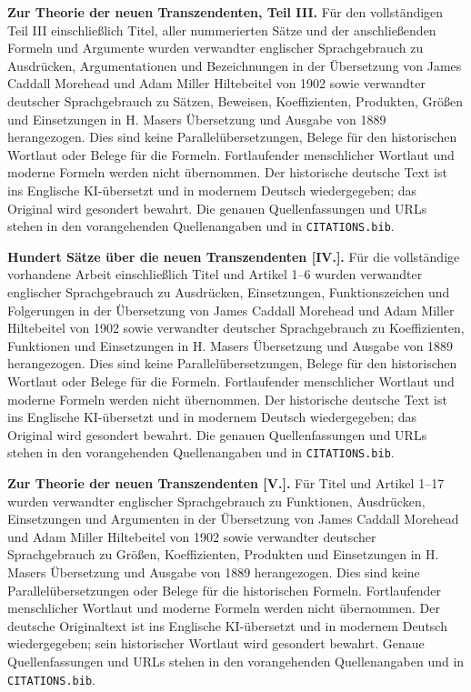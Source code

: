 \clearpage\thispagestyle{empty}\begingroup\fontsize{9}{9.5}\selectfont\raggedright
{}\medskip
\par\medskip\textbf{Zur Theorie der neuen Transzendenten, Teil III.} Für den vollständigen Teil III einschließlich Titel, aller nummerierten Sätze und der anschließenden Formeln und Argumente wurden verwandter englischer Sprachgebrauch zu Ausdrücken, Argumentationen und Bezeichnungen in der Übersetzung von James Caddall Morehead und Adam Miller Hiltebeitel von 1902 sowie verwandter deutscher Sprachgebrauch zu Sätzen, Beweisen, Koeffizienten, Produkten, Größen und Einsetzungen in H. Masers Übersetzung und Ausgabe von 1889 herangezogen. Dies sind keine Parallelübersetzungen, Belege für den historischen Wortlaut oder Belege für die Formeln. Fortlaufender menschlicher Wortlaut und moderne Formeln werden nicht übernommen. Der historische deutsche Text ist ins Englische KI-übersetzt und in modernem Deutsch wiedergegeben; das Original wird gesondert bewahrt. Die genauen Quellenfassungen und URLs stehen in den vorangehenden Quellenangaben und in \texttt{CITATIONS.bib}.
\par\medskip\textbf{Hundert Sätze über die neuen Transzendenten [IV.].} Für die vollständige vorhandene Arbeit einschließlich Titel und Artikel 1--6 wurden verwandter englischer Sprachgebrauch zu Ausdrücken, Einsetzungen, Funktionszeichen und Folgerungen in der Übersetzung von James Caddall Morehead und Adam Miller Hiltebeitel von 1902 sowie verwandter deutscher Sprachgebrauch zu Koeffizienten, Funktionen und Einsetzungen in H. Masers Übersetzung und Ausgabe von 1889 herangezogen. Dies sind keine Parallelübersetzungen, Belege für den historischen Wortlaut oder Belege für die Formeln. Fortlaufender menschlicher Wortlaut und moderne Formeln werden nicht übernommen. Der historische deutsche Text ist ins Englische KI-übersetzt und in modernem Deutsch wiedergegeben; das Original wird gesondert bewahrt. Die genauen Quellenfassungen und URLs stehen in den vorangehenden Quellenangaben und in \texttt{CITATIONS.bib}.
\par\endgroup\clearpage
\thispagestyle{empty}\begingroup\fontsize{9}{9.5}\selectfont\raggedright
{}\medskip
\textbf{Zur Theorie der neuen Transzendenten [V.].} Für Titel und Artikel 1--17 wurden verwandter englischer Sprachgebrauch zu Funktionen, Ausdrücken, Einsetzungen und Argumenten in der Übersetzung von James Caddall Morehead und Adam Miller Hiltebeitel von 1902 sowie verwandter deutscher Sprachgebrauch zu Größen, Koeffizienten, Produkten und Einsetzungen in H. Masers Übersetzung und Ausgabe von 1889 herangezogen. Dies sind keine Parallelübersetzungen oder Belege für die historischen Formeln. Fortlaufender menschlicher Wortlaut und moderne Formeln werden nicht übernommen. Der deutsche Originaltext ist ins Englische KI-übersetzt und in modernem Deutsch wiedergegeben; sein historischer Wortlaut wird gesondert bewahrt. Genaue Quellenfassungen und URLs stehen in den vorangehenden Quellenangaben und in \texttt{CITATIONS.bib}.
